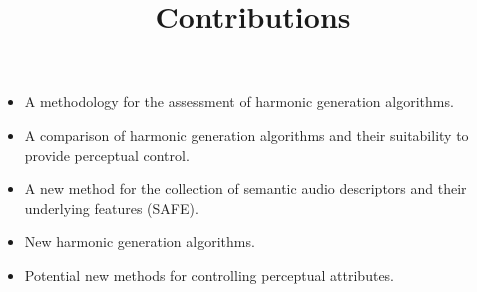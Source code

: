 \documentclass[a4paper]{article}
\title{Contributions}
\author{}
\date{}
\begin{document}
\maketitle

	\begin{itemize}
		\item A methodology for the assessment of harmonic generation algorithms.
		\item A comparison of harmonic generation algorithms and their suitability to provide perceptual control.
		\item A new method for the collection of semantic audio descriptors and their underlying features (SAFE).
		\item New harmonic generation algorithms.
		\item Potential new methods for controlling perceptual attributes.
	\end{itemize}
\end{document}
